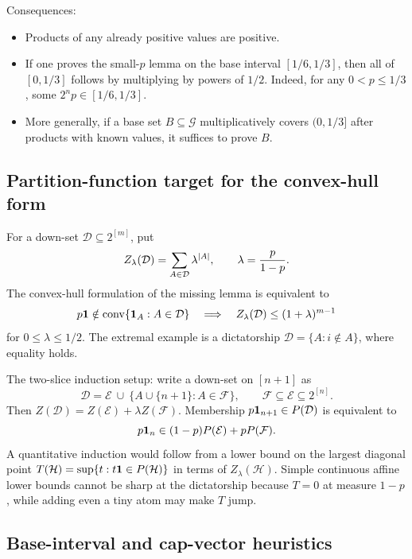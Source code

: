 \documentclass[12pt]{article}
\begin{document}
Consequences:
\begin{itemize}
\item Products of any already positive values are positive.
\item If one proves the small-\(p\) lemma on the base interval
  \([1/6,1/3]\), then all of \([0,1/3]\) follows by multiplying by powers of
  \(1/2\).  Indeed, for any \(0<p\le1/3\), some \(2^n p\in[1/6,1/3]\).
\item More generally, if a base set \(B\subseteq\mathcal G\) multiplicatively
  covers \((0,1/3]\) after products with known values, it suffices to prove
  \(B\).
\end{itemize}

\subsection*{Partition-function target for the convex-hull form}

For a down-set \(\mathcal D\subseteq2^{[m]}\), put
\[
        Z_\lambda(\mathcal D)=\sum_{A\in\mathcal D}\lambda^{|A|},
        \qquad \lambda={p\over 1-p}.
\]
The convex-hull formulation of the missing lemma is equivalent to
\[
 p{\bf1}\notin \operatorname{conv}\{\mathbf1_A:A\in\mathcal D\}
 \quad\Longrightarrow\quad
 Z_\lambda(\mathcal D)\le (1+\lambda)^{m-1}
\]
for \(0\le\lambda\le1/2\).  The extremal example is a dictatorship
\(\mathcal D=\{A:i\notin A\}\), where equality holds.

The two-slice induction setup: write a down-set on \([n+1]\) as
\[
        \mathcal D=\mathcal E\ \cup\ \{A\cup\{n+1\}:A\in\mathcal F\},
        \qquad \mathcal F\subseteq\mathcal E\subseteq2^{[n]}.
\]
Then \(Z(\mathcal D)=Z(\mathcal E)+\lambda Z(\mathcal F)\).  Membership
\(p{\bf1}_{n+1}\in P(\mathcal D)\) is equivalent to
\[
        p{\bf1}_n\in (1-p)P(\mathcal E)+pP(\mathcal F).
\]
A quantitative induction would follow from a lower bound on the largest
diagonal point \(T(\mathcal H)=\sup\{t:t{\bf1}\in P(\mathcal H)\}\) in terms of
\(Z_\lambda(\mathcal H)\).  Simple continuous affine lower bounds cannot be
sharp at the dictatorship because \(T=0\) at measure \(1-p\), while adding even
a tiny atom may make \(T\) jump.

\subsection*{Base-interval and cap-vector heuristics}
\end{document}
